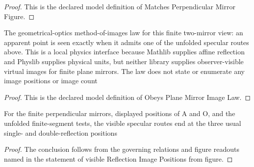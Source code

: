 \begin{proof}
  This is the declared model definition of Matches Perpendicular Mirror Figure.
\end{proof}
\begin{definition}
  \label{def:physics:phyx-mini-0068:phyxminiproblems-problemphyxmini0068-obeysplanemirrorimagelaw}
  The geometrical-optics method-of-images law for this finite two-mirror view: an apparent point is seen exactly when it admits one of the unfolded specular routes above. This is a local physics interface because Mathlib supplies affine reflection and Physlib supplies physical units, but neither library supplies observer-visible virtual images for finite plane mirrors. The law does not state or enumerate any image positions or image count
\end{definition}
\begin{proof}
  This is the declared model definition of Obeys Plane Mirror Image Law.
\end{proof}
\begin{lemma}
  \label{lem:physics:phyx-mini-0068:phyxminiproblems-problemphyxmini0068-visiblereflectionimagepositions-from-figure}
  For the finite perpendicular mirrors, displayed positions of A and O, and the unfolded finite-segment tests, the visible specular routes end at the three usual single- and double-reflection positions
\end{lemma}
\begin{proof}
  The conclusion follows from the governing relations and figure readouts named in the statement of visible Reflection Image Positions from figure.
\end{proof}
